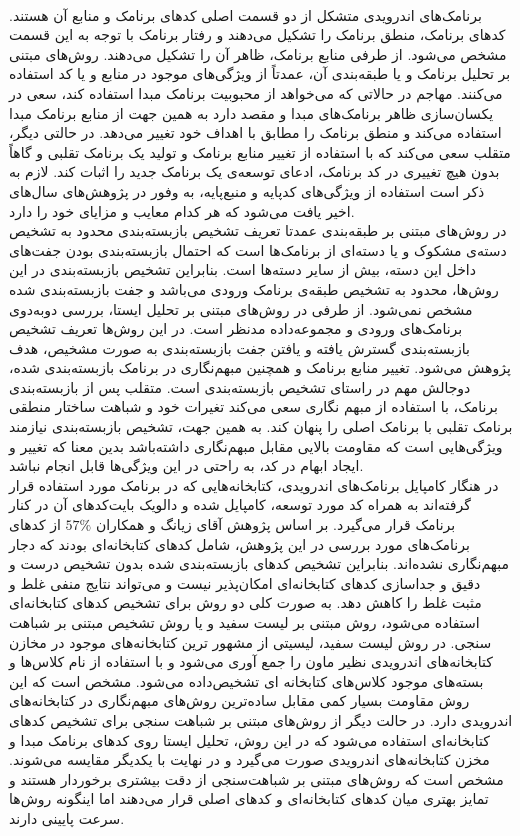 \\
برنامک‌های اندرویدی متشکل از دو قسمت اصلی کد‌های برنامک و منابع آن هستند. کد‌های برنامک، منطق برنامک را تشکیل می‌دهند و رفتار برنامک با توجه به این قسمت مشخص  می‌شود. از طرفی منابع برنامک، ظاهر آن را تشکیل می‌دهند. روش‌های مبتنی بر تحلیل برنامک و یا طبقه‌بندی آن، عمدتاً از ویژگی‌های موجود در منابع و یا کد استفاده می‌کنند. مهاجم در حالاتی که می‌خواهد از محبوبیت برنامک مبدا استفاده کند، سعی در یکسان‌سازی ظاهر برنامک‌های مبدا و مقصد دارد به همین جهت از منابع برنامک مبدا استفاده می‌کند و منطق برنامک را مطابق با اهداف خود تغییر می‌دهد. در حالتی دیگر، متقلب سعی می‌کند که با استفاده از تغییر منابع برنامک و تولید یک برنامک تقلبی و گاهاً بدون هیچ تغییری در کد برنامک، ادعای توسعه‌ی یک برنامک جدید را اثبات کند. لازم به ذکر است استفاده از ویژگی‌های کد‌پایه و منبع‌پایه، به وفور در پژوهش‌های سال‌های اخیر یافت می‌شود که هر کدام معایب و مزایای خود را دارد.\\
در روش‌های مبتنی بر طبقه‌بندی عمدتا تعریف تشخیص بازبسته‌بندی محدود به تشخیص دسته‌ی مشکوک و یا دسته‌ای از برنامک‌ها است که احتمال بازبسته‌بندی بودن جفت‌های داخل این دسته‌، بیش از سایر دسته‌ها است. بنابراین تشخیص بازبسته‌بندی در این روش‌ها، محدود به تشخیص طبقه‌ی برنامک‌ ورودی می‌باشد و جفت بازبسته‌بندی شده مشخص نمی‌شود. از طرفی در روش‌های مبتنی بر تحلیل ایستا، بررسی دوبه‌دوی برنامک‌های ورودی و مجموعه‌داده مدنظر است. در این روش‌ها تعریف تشخیص بازبسته‌بندی گسترش یافته و یافتن جفت بازبسته‌بندی به صورت مشخیص، هدف پژوهش می‌شود. 
تغییر منابع برنامک‌ و همچنین مبهم‌نگاری در برنامک بازبسته‌بندی شده، دوجالش مهم در راستای تشخیص بازبسته‌بندی است. متقلب پس از بازبسته‌بندی برنامک، با استفاده از مبهم نگاری سعی می‌کند تغیرات خود و شباهت ساختار منطقی برنامک تقلبی با برنامک اصلی را پنهان کند. به همین جهت، تشخیص بازبسته‌بندی نیازمند ویژگی‌هایی است که مقاومت بالایی مقابل مبهم‌نگاری داشته‌باشد بدین معنا که تغییر و ایجاد ابهام در کد، به راحتی در این ویژگی‌ها قابل انجام نباشد. 
\\
در هنگار کامپایل برنامک‌های اندرویدی، کتابخانه‌هایی که در برنامک مورد استفاده قرار گرفته‌اند به همراه کد مورد توسعه، کامپایل شده و دالویک‌ بایت‌کد‌های آن در کنار برنامک قرار می‌گیرد. بر اساس پژوهش آقای زیانگ و همکاران  
$57\%$
از کد‌های برنامک‌های مورد بررسی در این پژوهش، شامل کد‌های کتابخانه‌ای بودند که دجار مبهم‌نگاری نشده‌اند. بنابراین تشخیص کد‌های بازبسته‌بندی شده بدون تشخیص درست و دقیق و جداسازی کد‌های کتابخانه‌ای امکان‌پذیر نیست و می‌تواند نتایج منفی غلط و مثبت غلط را کاهش دهد. به صورت کلی دو روش برای تشخیص کد‌های کتابخانه‌ای استفاده می‌شود، روش‌ مبتنی بر لیست سفید و یا روش تشخیص مبتنی بر شباهت سنجی. در روش لیست سفید، لیسیتی از مشهور ترین کتابخانه‌های موجود در مخازن کتابخانه‌های اندرویدی نظیر ماون را جمع آوری می‌شود و با استفاده از نام‌ کلاس‌ها و بسته‌های موجود کلاس‌های کتابخانه ای تشخیص‌داده می‌شود. مشخص است که این روش مقاومت بسیار کمی مقابل ساده‌ترین روش‌های مبهم‌نگاری در کتابخانه‌های اندرویدی دارد. در حالت دیگر از روش‌های مبتنی بر شباهت سنجی برای تشخیص کد‌های کتابخانه‌ای استفاده می‌شود که در این روش، تحلیل ایستا روی کد‌های برنامک‌ مبدا و مخزن کتابخانه‌های اندرویدی صورت می‌گیرد و در نهایت با یکدیگر مقایسه می‌شوند. مشخص است که روش‌های مبتنی بر شباهت‌سنجی از دقت بیشتری برخوردار هستند و تمایز بهتری میان کد‌های کتابخانه‌ای و کد‌های اصلی قرار می‌دهند اما اینگونه روش‌ها سرعت پایینی دارند. 
